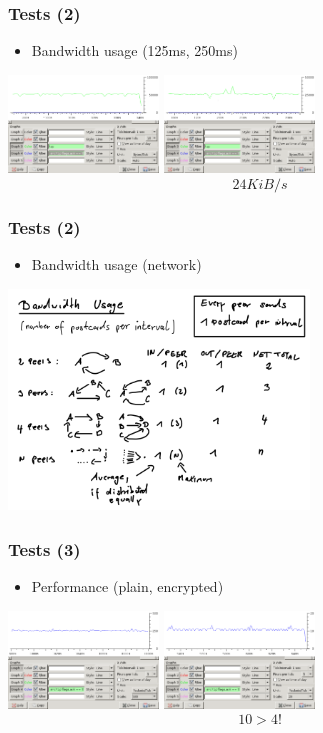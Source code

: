 \documentclass{beamer}
\begin{document}
\frame
{
  \frametitle{Tests (2)}
  \begin{itemize}
          \item Bandwidth usage (125ms, 250ms)
   \end{itemize}
  \begin{center}
   \includegraphics[width=4cm]{../bandwidth-0125.png}
   \includegraphics[width=4cm]{../bandwidth-0250.png}
   $$24 KiB/s$$
  \end{center}
}

\frame
{
  \frametitle{Tests (2)}
  \begin{itemize}
          \item Bandwidth usage (network)
   \end{itemize}
  \begin{center}
   \includegraphics[width=8cm]{../bandwidth.png}
  \end{center}
}

\frame
{
  \frametitle{Tests (3)}
  \begin{itemize}
          \item Performance (plain, encrypted)
   \end{itemize}
  \begin{center}
   \includegraphics[width=4cm]{../noise-plain-no-limit.png}
   \includegraphics[width=4cm]{../noise-no-limit.png}
   $$10 > 4!$$
  \end{center}
}
\end{document}

